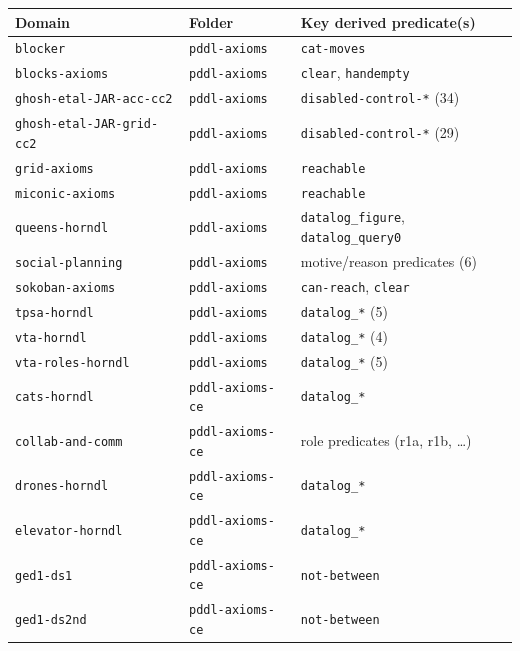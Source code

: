 \documentclass[11pt,a4paper]{article}
\begin{document}
\begin{itemize}
    \smallskip
    \begin{center}
    \begin{tabular}{lll}
    \toprule
    \textbf{Domain} & \textbf{Folder} & \textbf{Key derived predicate(s)} \\
    \midrule
    \texttt{blocker}              & \texttt{pddl-axioms} & \texttt{cat-moves} \\
    \texttt{blocks-axioms}        & \texttt{pddl-axioms} & \texttt{clear}, \texttt{handempty} \\
    \texttt{ghosh-etal-JAR-acc-cc2} & \texttt{pddl-axioms} & \texttt{disabled-control-*} (34) \\
    \texttt{ghosh-etal-JAR-grid-cc2} & \texttt{pddl-axioms} & \texttt{disabled-control-*} (29) \\
    \texttt{grid-axioms}          & \texttt{pddl-axioms} & \texttt{reachable} \\
    \texttt{miconic-axioms}       & \texttt{pddl-axioms} & \texttt{reachable} \\
    \texttt{queens-horndl}        & \texttt{pddl-axioms} & \texttt{datalog\_figure}, \texttt{datalog\_query0} \\
    \texttt{social-planning}      & \texttt{pddl-axioms} & motive/reason predicates (6) \\
    \texttt{sokoban-axioms}       & \texttt{pddl-axioms} & \texttt{can-reach}, \texttt{clear} \\
    \texttt{tpsa-horndl}          & \texttt{pddl-axioms} & \texttt{datalog\_*} (5) \\
    \texttt{vta-horndl}           & \texttt{pddl-axioms} & \texttt{datalog\_*} (4) \\
    \texttt{vta-roles-horndl}     & \texttt{pddl-axioms} & \texttt{datalog\_*} (5) \\
    \midrule
    \texttt{cats-horndl}          & \texttt{pddl-axioms-ce} & \texttt{datalog\_*} \\
    \texttt{collab-and-comm}      & \texttt{pddl-axioms-ce} & role predicates (r1a, r1b, \ldots) \\
    \texttt{drones-horndl}        & \texttt{pddl-axioms-ce} & \texttt{datalog\_*} \\
    \texttt{elevator-horndl}      & \texttt{pddl-axioms-ce} & \texttt{datalog\_*} \\
    \texttt{ged1-ds1}             & \texttt{pddl-axioms-ce} & \texttt{not-between} \\
    \texttt{ged1-ds2nd}           & \texttt{pddl-axioms-ce} & \texttt{not-between} \\

\end{tabular}
\end{center}
\end{itemize}
\end{document}
